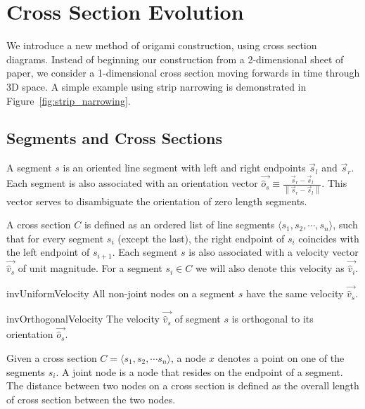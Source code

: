 \section{Cross Section Evolution}
\label{sec:cross_sections}

We introduce a new method of origami construction, using cross section diagrams.
Instead of beginning our construction from a 2-dimensional sheet of paper, we
consider a 1-dimensional cross section moving forwards in time through 3D space.
A simple example using strip narrowing\cite{strip_narrowing} is demonstrated in
Figure~\ref{fig:strip_narrowing}.

\subsection{Segments and Cross Sections}
\label{sec:segments_and_cross_sections}

\begin{definition}
\label{def:segment}
A segment $s$ is an oriented line segment with left and right endpoints $\vec s_l$ and $\vec s_r$.
Each segment is also associated with an orientation vector $\vec{\hat o_s} \equiv\frac{\vec s_r-\vec s_l}{ \left\| \vec s_r-\vec s_l\right\|}$.
This vector serves to disambiguate the orientation of zero length segments.
\end{definition}

\begin{definition}
\label{def:cross_section}
A cross section $C$ is defined as an ordered list of line segments $\langle s_1,s_2,\cdots,s_n\rangle$,
such that for every segment $s_i$ (except the last),
the right endpoint of $s_i$ coincides with the left endpoint of $s_{i+1}$.
Each segment $s$ is also associated with a velocity vector $\vec{\hat v_s}$ of unit magnitude.
For a segment $s_i\in C$ we will also denote this velocity as $\vec{\hat v_i}$.
\end{definition}

\vspace{-1pc}
\begin{restatable}{inv}{UniformVelocity}
\label{inv:uniform_velocity}
All non-joint nodes on a segment $s$ have the same velocity $\vec{\hat v_s}$.
\end{restatable}
\vspace{-1pc}

\begin{restatable}{inv}{OrthogonalVelocity}
\label{inv:orthogonal_velocity}
The velocity $\vec{\hat v_s}$ of segment $s$ is orthogonal to its orientation $\vec{\hat o_s}$.
\end{restatable}

\begin{definition}
\label{def:node}
Given a cross section $C = \langle s_1, s_2,\cdots s_n \rangle$, a node $x$ denotes a point on one of the segments $s_i$.
A joint node is a node that resides on the endpoint of a segment.
The distance between two nodes on a cross section is defined as the overall length of cross section between the two nodes.
\end{definition}





%
